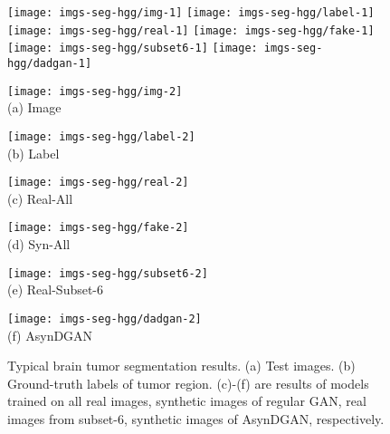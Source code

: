 \begin{figure*}[t]
	\vspace{-2em}
	\begin{center}
		\texttt{[image: imgs-seg-hgg/img-1]}
		\texttt{[image: imgs-seg-hgg/label-1]}
		\texttt{[image: imgs-seg-hgg/real-1]}
		\texttt{[image: imgs-seg-hgg/fake-1]}
		\texttt{[image: imgs-seg-hgg/subset6-1]}
		\texttt{[image: imgs-seg-hgg/dadgan-1]} \\ \vspace{0.01in}
		\begin{minipage}{0.15\linewidth}
			\centering\texttt{[image: imgs-seg-hgg/img-2]} \\ (a) Image
		\end{minipage}
		\begin{minipage}{0.15\linewidth}
			\centering\texttt{[image: imgs-seg-hgg/label-2]} \\ (b) Label
		\end{minipage}
		\begin{minipage}{0.15\linewidth}
			\centering\texttt{[image: imgs-seg-hgg/real-2]}  \\  (c) Real-All
		\end{minipage}
		\begin{minipage}{0.15\linewidth}
			\centering\texttt{[image: imgs-seg-hgg/fake-2]} \\ (d) Syn-All
		\end{minipage}
		\begin{minipage}{0.15\linewidth}
			\centering\texttt{[image: imgs-seg-hgg/subset6-2]} \\ (e) Real-Subset-6
		\end{minipage}
		\begin{minipage}{0.15\linewidth}
			\centering\texttt{[image: imgs-seg-hgg/dadgan-2]} \\ (f) AsynDGAN
		\end{minipage}
	\end{center}
	\caption{Typical brain tumor segmentation results. (a) Test images. (b) Ground-truth labels of tumor region. (c)-(f) are results of models trained on all real images, synthetic images of regular GAN, real images from subset-6, synthetic images of AsynDGAN, respectively.}
	\label{fig:seg:hgg}
\end{figure*}


